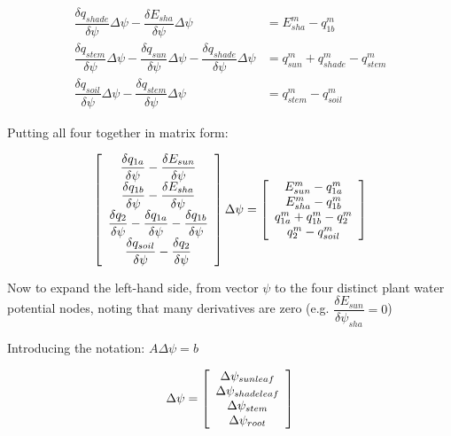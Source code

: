 \documentclass[draft,linenumbers]{agujournal}
\begin{document}
   \begin{linenomath*} \begin{equation} 
   \begin{aligned}
   \dfrac{\delta q_{shade}}{\delta\psi}\Delta\psi-\dfrac{\delta E_{sha}}{\delta\psi}\Delta\psi&=E_{sha}^{m}-q_{1b}^{m} \\
   \dfrac{\delta q_{stem}}{\delta\psi}\Delta\psi-\dfrac{\delta q_{sun}}{\delta\psi}\Delta\psi-\dfrac{\delta q_{shade}}{\delta\psi}\Delta\psi&=q_{sun}^{m}+q_{shade}^{m}-q_{stem}^{m} \\
   \dfrac{\delta q_{soil}}{\delta\psi}\Delta\psi-\dfrac{\delta q_{stem}}{\delta\psi}\Delta\psi&=q_{stem}^{m}-q_{soil}^{m}
   \end{aligned}
   \end{equation} \end{linenomath*}

Putting all four together in matrix form:

   \begin{linenomath*} \begin{equation} 
   \left[ \begin {array}{c}
   \dfrac{\delta q_{1a}}{\delta\psi}-\dfrac{\delta E_{sun}}{\delta\psi} \cr
   \dfrac{\delta q_{1b}}{\delta\psi}-\dfrac{\delta E_{sha}}{\delta\psi} \cr
   \dfrac{\delta q_2}{\delta\psi}-\dfrac{\delta q_{1a}}{\delta\psi}-\dfrac{\delta q_{1b}}{\delta\psi} \cr
   \dfrac{\delta q_{soil}}{\delta\psi}-\dfrac{\delta q_2}{\delta\psi}
   \end {array} \right]
   \Delta\psi=
   \left[ \begin {array}{c}
   E_{sun}^{m}-q_{1a}^{m} \cr
   E_{sha}^{m}-q_{1b}^{m} \cr
   q_{1a}^{m}+q_{1b}^{m}-q_2^{m} \cr
   q_2^{m}-q_{soil}^{m}
   \end {array} \right]
   \end{equation} \end{linenomath*}

Now to expand the left-hand side, from vector $\psi$ to the four distinct plant water potential nodes, noting that many derivatives are zero (e.g. $\dfrac{\delta E_{sun}}{\delta\psi_{sha}}=0$)

Introducing the notation:
$A\Delta\psi=b$

   \begin{linenomath*} \begin{equation} 
   \Delta\psi=\left[ \begin {array}{c}
   \Delta\psi_{sunleaf} \cr
   \Delta\psi_{shadeleaf} \cr
   \Delta\psi_{stem} \cr
   \Delta\psi_{root}
   \end {array} \right] 
   \end{equation} \end{linenomath*}
\end{document}
